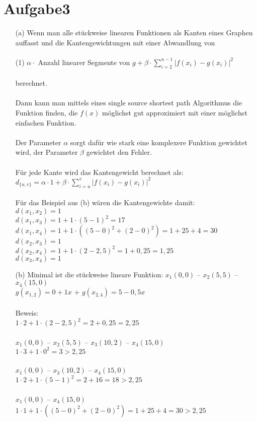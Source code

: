 \documentclass{article}
\begin{document}
\section*{Aufgabe3}
\begin{enumerate}
\item[(a)] Wenn man alle stückweise linearen Funktionen als Kanten eines Graphen auffasst und die Kantengewichtungen mit einer Abwandlung von \\\\
(1) $ \alpha \cdot$ Anzahl linearer Segmente von $g + \beta \cdot \sum_{i=2}^{n-1} \lvert f(x_i)-g(x_i) \lvert ^2$ \\\\
berechnet. \\\\
Dann kann man mittels eines single source shortest path Algorithmus die Funktion finden, die $f(x)$ möglichst gut approximiert mit einer möglichst einfachen Funktion. \\\\
Der Parameter $\alpha$ sorgt dafür wie stark eine komplexere Funktion gewichtet wird, der Parameter $\beta$ gewichtet den Fehler.\\\\
Für jede Kante wird das Kantengewicht berechnet als:\\
 $d_{\{u,v\}} = \alpha \cdot 1 + \beta \cdot \sum_{i=u}^{v} \lvert f(x_i)-g(x_i) \lvert ^2$\\\\
 Für das Beispiel aus (b) wären die Kantengewichte damit:\\
 $d(x_1,x_2) = 1$ \\
 $d(x_1,x_3) = 1 + 1 \cdot (5-1)^2 = 17$ \\
 $d(x_1,x_4) = 1 + 1 \cdot ((5-0)^2+(2-0)^2) = 1 + 25 + 4 = 30$ \\
 $d(x_2,x_3) = 1$ \\
 $d(x_2,x_4) = 1+1 \cdot (2-2,5)^2 = 1+0,25=1,25$ \\
 $d(x_3,x_4) = 1$\\
\item[(b)] Minimal ist die stückweise lineare Funktion: $x_1 (0,0)$ -- $x_2 (5,5)$ -- $x_4 (15,0)$ \\
$g(x_{1,2}) = 0 + 1x$ + $g(x_ {2,4}) = 5 - 0,5x$ \\\\
Beweis: \\
$1 \cdot 2 + 1 \cdot (2-2,5)^2 = 2+ 0,25 = 2,25$\\\\
$x_1 (0,0)$ -- $x_2 (5,5)$ -- $x_3 (10,2)$ -- $x_4 (15,0)$ \\
$1 \cdot 3 + 1 \cdot 0^2=3>2,25$\\\\
$x_1 (0,0)$ -- $x_3 (10,2)$ -- $x_4 (15,0)$ \\
$1 \cdot 2 + 1 \cdot (5-1)^2 = 2 + 16 = 18> 2,25$\\\\
$x_1 (0,0)$ -- $x_4 (15,0)$ \\
$1 \cdot 1 + 1 \cdot ((5-0)^2+(2-0)^2) = 1 + 25 + 4 = 30 >2,25$\\
\end{enumerate}
\end{document}
